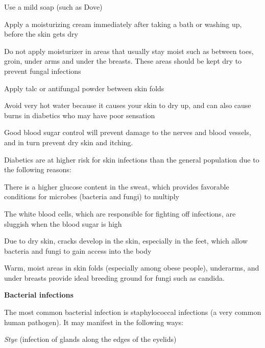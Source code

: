 \item Use a mild soap (such as Dove)

 \item Apply a moisturizing cream immediately after taking a bath or washing up, before the skin gets dry

 \item Do not apply moisturizer in areas that usually stay moist such as between toes, groin, under arms and under the breasts. These areas should be kept dry to prevent fungal infections

 \item Apply talc or antifungal powder between skin folds

 \item Avoid very hot water because it causes your skin to dry up, and can also cause burns in diabetics who may have poor sensation

 \item Good blood sugar control will prevent damage to the nerves and blood vessels, and in turn prevent dry skin and itching.


Diabetics are at higher risk for skin infections than the general population due to the following reasons:

\item There is a higher glucose content in the sweat, which provides favorable conditions for microbes (bacteria and fungi) to multiply

 \item The white blood cells, which are responsible for fighting off infections, are sluggish when the blood sugar is high

 \item Due to dry skin, cracks develop in the skin, especially in the feet, which allow bacteria and fungi to gain access into the body

 \item Warm, moist areas in skin folds (especially among obese people), underarms, and under breasts provide ideal breeding ground for fungi such as candida.

\textbf{Bacterial infections}

The most common bacterial infection is staphylococcal infections (a very common human pathogen). It may manifest in the following ways:

\item \textit{Stye} (infection of glands along the edges of the eyelids)

